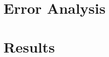 \documentclass{article}
\begin{document}
\begin{multicols}{2}
\section{Error Analysis}
\section{Results}

\end{multicols}
\end{document}
